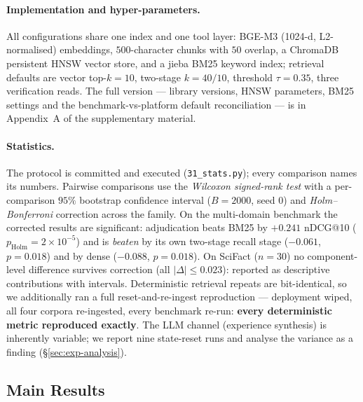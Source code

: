 \documentclass[sigconf, review, anonymous]{acmart}
\begin{document}
\paragraph{Implementation and hyper-parameters.} All configurations share one
index and one tool layer: BGE-M3 (1024-d, L2-normalised) \cite{chen2024bgem3}
embeddings, $500$-character chunks with $50$ overlap, a ChromaDB persistent
HNSW vector store, and a jieba BM25 keyword index; retrieval defaults are
vector top-$k=10$, two-stage $k{=}40/10$, threshold $\tau=0.35$, three
verification reads. The full version --- library versions, HNSW parameters,
BM25 settings and the benchmark-vs-platform default reconciliation --- is in
Appendix~A of the supplementary material.

\paragraph{Statistics.} The protocol is committed and executed
(\texttt{31\_stats.py}); every comparison names its numbers. Pairwise
comparisons use the \emph{Wilcoxon signed-rank
test} with a per-comparison $95\%$ bootstrap confidence interval ($B{=}2000$,
seed $0$) and \emph{Holm--Bonferroni} correction across the family. On the
multi-domain benchmark the corrected results are significant: adjudication
beats BM25 by $+0.241$ nDCG@10 ($p_{\mathrm{Holm}}{=}2\times10^{-5}$) and is
\emph{beaten} by its own two-stage recall stage ($-0.061$, $p{=}0.018$) and by
dense ($-0.088$, $p{=}0.018$). On SciFact ($n{=}30$) no component-level
difference survives correction (all $|\Delta| \le 0.023$): reported as
descriptive contributions with intervals. Deterministic retrieval repeats are
bit-identical, so we additionally ran a full reset-and-re-ingest reproduction
--- deployment wiped, all four corpora re-ingested, every benchmark re-run:
\textbf{every deterministic metric reproduced exactly}. The LLM channel
(experience synthesis) is inherently variable; we report nine state-reset runs
and analyse the variance as a finding (\S\ref{sec:exp-analysis}).

\subsection{Main Results}\label{sec:main}


\end{document}
